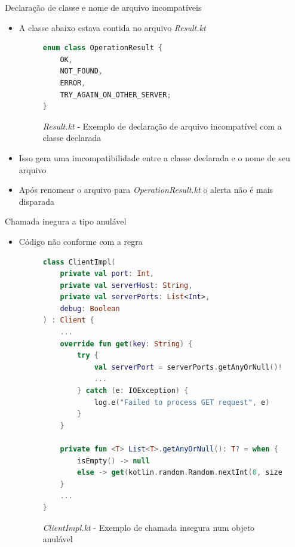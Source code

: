 \documentclass[brazilian]{beamer}
\begin{document}
\begin{frame}[fragile]{Declaração de classe e nome de arquivo incompatíveis}
    \begin{itemize}
        \item A classe abaixo estava contida no arquivo \emph{Result.kt}
        \begin{figure}[H]
            \centering
            \begin{lstlisting}[language=Kotlin]
enum class OperationResult {
    OK,
    NOT_FOUND,
    ERROR,
    TRY_AGAIN_ON_OTHER_SERVER;
}
            \end{lstlisting}
            \caption{\textit{Result.kt} - Exemplo de declaração de arquivo incompatível com a classe declarada}
            \label{fig:detekt_matching_declaration_name_before_example}
        \end{figure}
        \item Isso gera uma imcompatibilidade entre a classe declarada e o nome de seu arquivo
        \item Após renomear o arquivo para \emph{OperationResult.kt} o alerta não é mais disparada
    \end{itemize}
\end{frame}

\begin{frame}[fragile]{Chamada inegura a tipo anulável}
    \begin{itemize}
        \item Código não conforme com a regra
        \begin{figure}[H]
            \centering
            \begin{lstlisting}[language=Kotlin]
class ClientImpl(
    private val port: Int,
    private val serverHost: String,
    private val serverPorts: List<Int>,
    debug: Boolean
) : Client {
    ...
    override fun get(key: String) {
        try {
            val serverPort = serverPorts.getAnyOrNull()!!
            ...
        } catch (e: IOException) {
            log.e("Failed to process GET request", e)
        }
    }

    private fun <T> List<T>.getAnyOrNull(): T? = when {
        isEmpty() -> null
        else -> get(kotlin.random.Random.nextInt(0, size))
    }
    ...
}
            \end{lstlisting}
            \caption{\textit{ClientImpl.kt} - Exemplo de chamada insegura num objeto anulável}
            \label{fig:detekt_unsafe_null_call_on_nullable_before_example}
        \end{figure}
    \end{itemize}
\end{frame}
\end{document}
